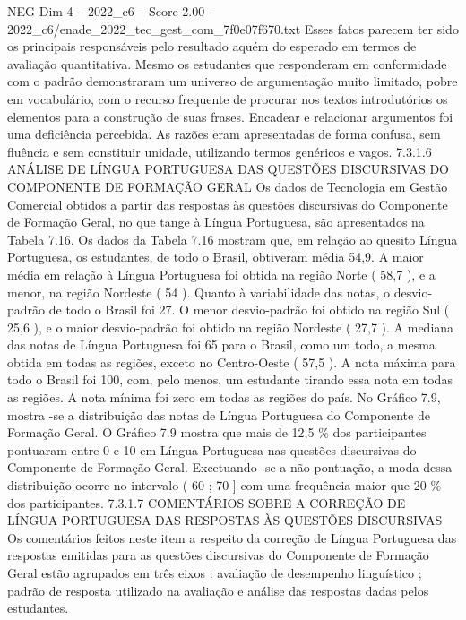 \begin{textsample}{NEG Dim 4 – 2022\_c6 – Score 2.00 – 2022\_c6/enade\_2022\_tec\_gest\_com\_7f0e07f670.txt}
Esses fatos parecem ter sido os principais responsáveis pelo resultado aquém do esperado em termos de avaliação quantitativa.
Mesmo os estudantes que responderam em conformidade com o padrão demonstraram um universo de argumentação muito limitado, pobre em vocabulário, com o recurso frequente de procurar nos textos introdutórios os elementos para a construção de suas frases.
Encadear e relacionar argumentos foi uma deficiência percebida.
As razões eram apresentadas de forma confusa, sem fluência e sem constituir unidade, utilizando termos genéricos e vagos. 7.3.1.6 ANÁLISE DE LÍNGUA PORTUGUESA DAS QUESTÕES DISCURSIVAS DO COMPONENTE DE FORMAÇÃO GERAL Os dados de Tecnologia em Gestão Comercial obtidos a partir das respostas às questões discursivas do Componente de Formação Geral, no que tange à Língua Portuguesa, são apresentados na Tabela 7.16.
Os dados da Tabela 7.16 mostram que, em relação ao quesito Língua Portuguesa, os estudantes, de todo o Brasil, obtiveram média 54,9.
A maior média em relação à Língua Portuguesa foi obtida na região Norte ( 58,7 ), e a menor, na região Nordeste ( 54 ).
Quanto à variabilidade das notas, o desvio-padrão de todo o Brasil foi 27.
O menor desvio-padrão foi obtido na região Sul ( 25,6 ), e o maior desvio-padrão foi obtido na região Nordeste ( 27,7 ).
A mediana das notas de Língua Portuguesa foi 65 para o Brasil, como um todo, a mesma obtida em todas as regiões, exceto no Centro-Oeste ( 57,5 ).
A nota máxima para todo o Brasil foi 100, com, pelo menos, um estudante tirando essa nota em todas as regiões.
A nota mínima foi zero em todas as regiões do país.
No Gráfico 7.9, mostra -se a distribuição das notas de Língua Portuguesa do Componente de Formação Geral.
O Gráfico 7.9 mostra que mais de 12,5 \% dos participantes pontuaram entre 0 e 10 em Língua Portuguesa nas questões discursivas do Componente de Formação Geral.
Excetuando -se a não pontuação, a moda dessa distribuição ocorre no intervalo ( 60 ; 70 ] com uma frequência maior que 20 \% dos participantes. 7.3.1.7 COMENTÁRIOS SOBRE A CORREÇÃO DE LÍNGUA PORTUGUESA DAS RESPOSTAS ÀS QUESTÕES DISCURSIVAS Os comentários feitos neste item a respeito da correção de Língua Portuguesa das respostas emitidas para as questões discursivas do Componente de Formação Geral estão agrupados em três eixos : avaliação de desempenho linguístico ; padrão de resposta utilizado na avaliação e análise das respostas dadas pelos estudantes.

\end{textsample}
